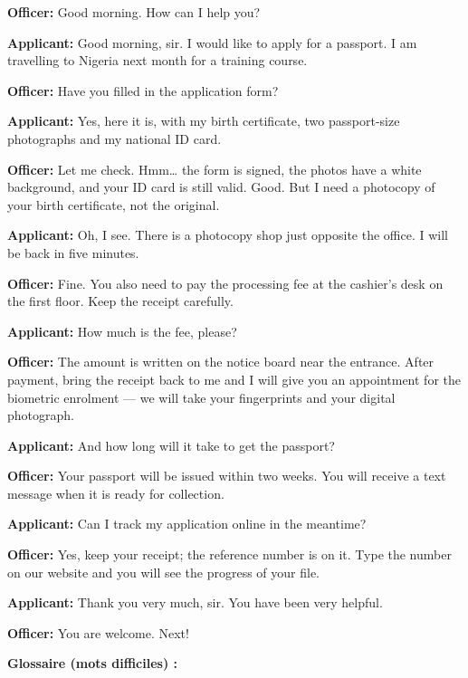 \documentclass[11pt]{article}
\begin{document}
\begin{textebox}
\textbf{Officer:} Good morning. How can I help you?

\textbf{Applicant:} Good morning, sir. I would like to apply for a passport. I am travelling to Nigeria next month for a training course.

\textbf{Officer:} Have you filled in the application form?

\textbf{Applicant:} Yes, here it is, with my birth certificate, two passport-size photographs and my national ID card.

\textbf{Officer:} Let me check. Hmm\ldots{} the form is signed, the photos have a white background, and your ID card is still valid. Good. But I need a photocopy of your birth certificate, not the original.

\textbf{Applicant:} Oh, I see. There is a photocopy shop just opposite the office. I will be back in five minutes.

\textbf{Officer:} Fine. You also need to pay the processing fee at the cashier's desk on the first floor. Keep the receipt carefully.

\textbf{Applicant:} How much is the fee, please?

\textbf{Officer:} The amount is written on the notice board near the entrance. After payment, bring the receipt back to me and I will give you an appointment for the biometric enrolment — we will take your fingerprints and your digital photograph.

\textbf{Applicant:} And how long will it take to get the passport?

\textbf{Officer:} Your passport will be issued within two weeks. You will receive a text message when it is ready for collection.

\textbf{Applicant:} Can I track my application online in the meantime?

\textbf{Officer:} Yes, keep your receipt; the reference number is on it. Type the number on our website and you will see the progress of your file.

\textbf{Applicant:} Thank you very much, sir. You have been very helpful.

\textbf{Officer:} You are welcome. Next!
\end{textebox}

\textbf{Glossaire (mots difficiles) :}
\end{document}
